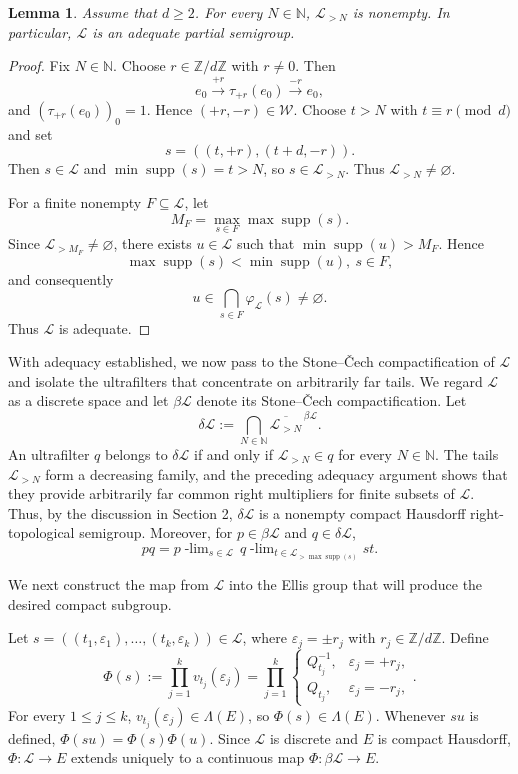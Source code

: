\documentclass[11pt]{amsart}
\newtheorem{lemma}[theorem]{Lemma}
\theoremstyle{definition}
\theoremstyle{remark}
\newcommand{\N}{\mathbb N}
\newcommand{\Z}{\mathbb Z}
\newcommand{\cL}{\mathcal L}
\newcommand{\cW}{\mathcal W}
\newcommand{\supp}{\operatorname{supp}}
\newcommand{\ulim}[2]{#1\!\operatorname{-lim}_{#2}}
\begin{document}
\begin{lemma}\label{lem:L-adequate}
Assume that $d\geq2$. For every $N\in \N$,  $\cL_{>N}$ is nonempty.  In particular, $\cL$ is an adequate partial semigroup.
\end{lemma}

\begin{proof}
Fix $N\in\N$.  Choose $r\in\Z/d\Z$ with $r\neq0$.  Then
\[
 e_0 \xrightarrow{+r} \tau_{+r}(e_0) \xrightarrow{-r}e_0,
\]
and $(\tau_{+r}(e_0))_0=1$. Hence $(+r,-r)\in\cW$.
Choose $t>N$ with $t\equiv r\pmod d$ and set
\[
 s=((t,+r),(t+d,-r)).
\]
Then $s\in\cL$ and $\min\supp(s)=t>N$,
so $s\in\cL_{>N}$.
Thus $\cL_{>N}\neq\varnothing$.

For a finite nonempty $F\subseteq\cL$, let
\[
 M_F=\max_{s\in F}\max\supp(s).
\]
Since $\mathcal L_{>M_F}\neq\varnothing$, there exists
$u\in\mathcal L$ such that $\min\supp(u)>M_F$.
Hence
\[
\max\supp(s)<\min\supp(u),\  s\in F,
\]
and consequently
\[
u\in\bigcap_{s\in F}\varphi_{\mathcal L}(s)\neq\varnothing.
\]
Thus $\mathcal L$ is adequate.
 
\end{proof}

With adequacy established, we now pass to the Stone--\v{C}ech
compactification of $\cL$ and isolate the ultrafilters that concentrate on arbitrarily far tails. We regard $\cL$ as a discrete space and let $\beta\cL$ denote its Stone--\v{C}ech compactification.
Let
\[
 \delta\cL:=\bigcap_{N\in\N}\overline{\cL_{>N}}^{\,\beta\cL}.
\]
An ultrafilter $q$ belongs to $\delta\cL$ if and only if
$\cL_{>N}\in q$ for every $N\in\N$.
The tails $\cL_{>N}$ form a decreasing family, and the preceding
adequacy argument shows that they provide arbitrarily far common right
multipliers for finite subsets of $\cL$.  Thus, by the discussion in
Section 2, $\delta\cL$ is a nonempty compact Hausdorff right-topological
semigroup.  Moreover, for $p\in\beta\cL$ and $q\in\delta\cL$,
\[
 pq=\ulim{p}{s\in\cL}\,
     \ulim{q}{t\in\cL_{>\max\supp(s)}}st.
\]


 We next construct the map from $\cL$ into the Ellis group that will produce the desired compact subgroup.

Let $s=((t_1,\varepsilon_1),\ldots,(t_k,\varepsilon_k))\in\cL$, where
$\varepsilon_j=\pm r_j$ with $r_j\in\mathbb Z/d\mathbb Z$.  Define
\[
 \Phi(s):=\prod_{j=1}^k v_{t_j}(\varepsilon_j)
=\prod_{j=1}^k\begin{cases}Q_{t_j}^{-1},&\varepsilon_j=+r_j,\\
Q_{t_j},&\varepsilon_j=-r_j, 
  \end{cases}.
\]
For every $1\leq j\leq k$, $v_{t_j}(\varepsilon_j)\in\Lambda(E)$, so $\Phi(s)\in\Lambda(E)$.  Whenever $su$ is defined,
$\Phi(su)=\Phi(s)\Phi(u)$. Since $\cL$ is discrete and $E$ is compact Hausdorff, $\Phi:\cL\to E$ extends uniquely to a continuous map $\Phi:\beta\cL\to E$.
 
\end{document}
